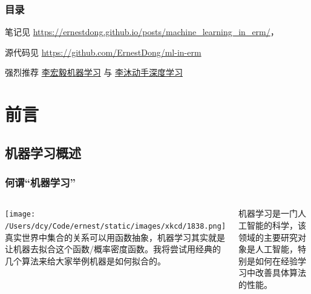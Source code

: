 
\maketitle
\begin{frame}
    \frametitle{目录}
    \tableofcontents[hideallsubsections]
    \small 笔记见 \url{https://ernestdong.github.io/posts/machine_learning_in_erm/}，

    \small 源代码见 \url{https://github.com/ErnestDong/ml-in-erm}

    \small 强烈推荐 \href{https://www.youtube.com/watch?v=Ye018rCVvOo&list=PLJV_el3uVTsMhtt7_Y6sgTHGHp1Vb2P2J}{李宏毅机器学习}
    \small 与 \href{https://zh-v2.d2l.ai/}{李沐动手深度学习}
\end{frame}

\section{前言}
\subsection{机器学习概述}
\begin{frame}
    \frametitle{何谓“机器学习”}
    \begin{columns}
        \texttt{[image: /Users/dcy/Code/ernest/static/images/xkcd/1838.png]}
        真实世界中集合的关系可以用函数抽象，机器学习其实就是让机器去拟合这个函数/概率密度函数。我将尝试用经典的几个算法来给大家举例机器是如何拟合的。

        \begin{definition}
            机器学习是一门人工智能的科学，该领域的主要研究对象是人工智能，特别是如何在经验学习中改善具体算法的性能。
        \end{definition}
    \end{columns}
\end{frame}
